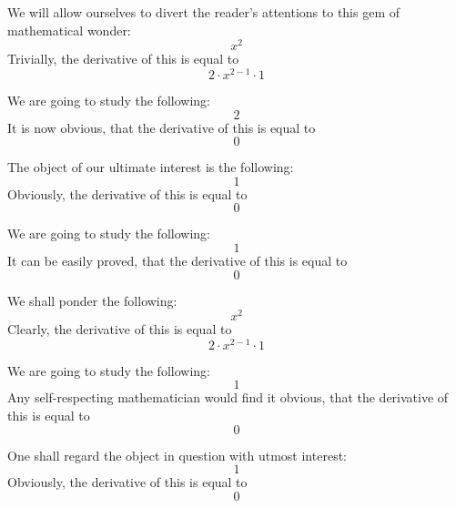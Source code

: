 \documentclass{article}
\begin{document}
We will allow ourselves to divert the reader's attentions to this gem of mathematical wonder:
\begin{equation}
x ^{2 } 
\end{equation}
Trivially, the derivative of this is equal to
\begin{equation}
2 \cdot x ^{2 - 1 } \cdot 1 
\end{equation}

We are going to study the following:
\begin{equation}
2 
\end{equation}
It is now obvious, that the derivative of this is equal to
\begin{equation}
0 
\end{equation}

The object of our ultimate interest is the following:
\begin{equation}
1 
\end{equation}
Obviously, the derivative of this is equal to
\begin{equation}
0 
\end{equation}

We are going to study the following:
\begin{equation}
1 
\end{equation}
It can be easily proved, that the derivative of this is equal to
\begin{equation}
0 
\end{equation}

We shall ponder the following:
\begin{equation}
x ^{2 } 
\end{equation}
Clearly, the derivative of this is equal to
\begin{equation}
2 \cdot x ^{2 - 1 } \cdot 1 
\end{equation}

We are going to study the following:
\begin{equation}
1 
\end{equation}
Any self-respecting mathematician would find it obvious, that the derivative of this is equal to
\begin{equation}
0 
\end{equation}

One shall regard the object in question with utmost interest:
\begin{equation}
1 
\end{equation}
Obviously, the derivative of this is equal to
\begin{equation}
0 
\end{equation}
\end{document}
